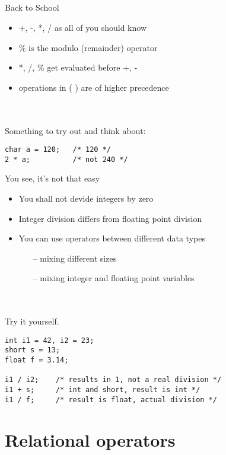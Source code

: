 \subsection{}
\begin{frame}[fragile]{Back to School}
	\begin{itemize}
		\item +, -, *, / as all of you should know
		\item \% is the modulo (remainder) operator
		\item *, /, \% get evaluated before +, -
		\item operations in (  ) are of higher precedence
	\end{itemize}
	\ \\\ \\Something to try out and think about:
	\begin{lstlisting}[numbers=none]
char a = 120;	/* 120 */
2 * a;			/* not 240 */
\end{lstlisting}
\end{frame}
\begin{frame}[fragile]{You see, it's not that easy}
	\begin{itemize}
		\item You shall not devide integers by zero
		\item Integer division differs from floating point division
		\item You can use operators between different data types
		\begin{itemize}
			\item[--] mixing different sizes
			\item[--] mixing integer and floating point variables
		\end{itemize}
	\end{itemize}
	\ \\\ \\Try it yourself.
	\begin{lstlisting}[numbers=none]
int i1 = 42, i2 = 23;
short s = 13;
float f = 3.14;

i1 / i2;	/* results in 1, not a real division */
i1 + s;		/* int and short, result is int */
i1 / f;		/* result is float, actual division */
\end{lstlisting}
\end{frame}
\section{Relational operators}
